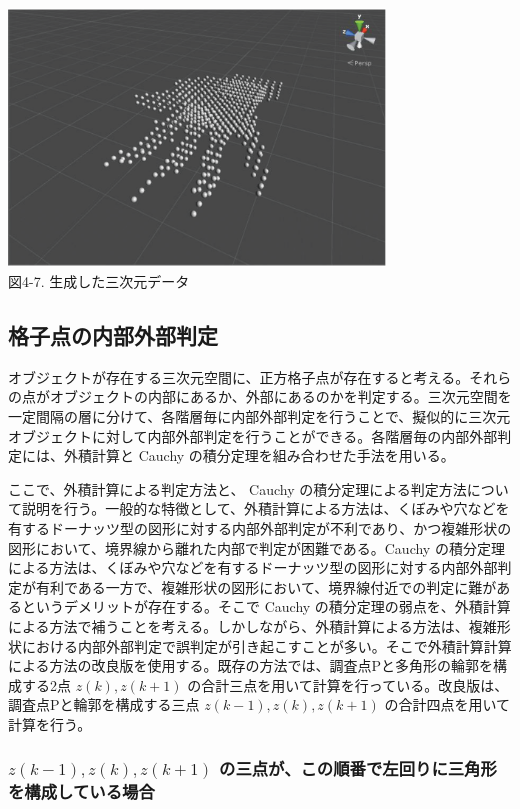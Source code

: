 \begin{center}
  \includegraphics[width=10cm]{Simulator_data_3d.eps} \\
 \vspace{1mm}
  図4-7. 生成した三次元データ
\end{center}



\newpage
\subsection{格子点の内部外部判定}
オブジェクトが存在する三次元空間に、正方格子点が存在すると考える。それらの点がオブジェクトの内部にあるか、外部にあるのかを判定する。三次元空間を一定間隔の層に分けて、各階層毎に内部外部判定を行うことで、擬似的に三次元オブジェクトに対して内部外部判定を行うことができる。各階層毎の内部外部判定には、外積計算と Cauchy の積分定理を組み合わせた手法を用いる。

ここで、外積計算による判定方法と、 Cauchy の積分定理による判定方法について説明を行う。一般的な特徴として、外積計算による方法は、くぼみや穴などを有するドーナッツ型の図形に対する内部外部判定が不利であり、かつ複雑形状の図形において、境界線から離れた内部で判定が困難である。Cauchy の積分定理による方法は、くぼみや穴などを有するドーナッツ型の図形に対する内部外部判定が有利である一方で、複雑形状の図形において、境界線付近での判定に難があるというデメリットが存在する。そこで Cauchy の積分定理の弱点を、外積計算による方法で補うことを考える。しかしながら、外積計算による方法は、複雑形状における内部外部判定で誤判定が引き起こすことが多い。そこで外積計算計算による方法の改良版を使用する。既存の方法では、調査点Pと多角形の輪郭を構成する2点 $z(k),z(k+1)$ の合計三点を用いて計算を行っている。改良版は、調査点Pと輪郭を構成する三点 $z(k-1),z(k),z(k+1)$ の合計四点を用いて計算を行う。

\subsubsection{$z(k-1),z(k),z(k+1)$ の三点が、この順番で左回りに三角形を構成している場合}

